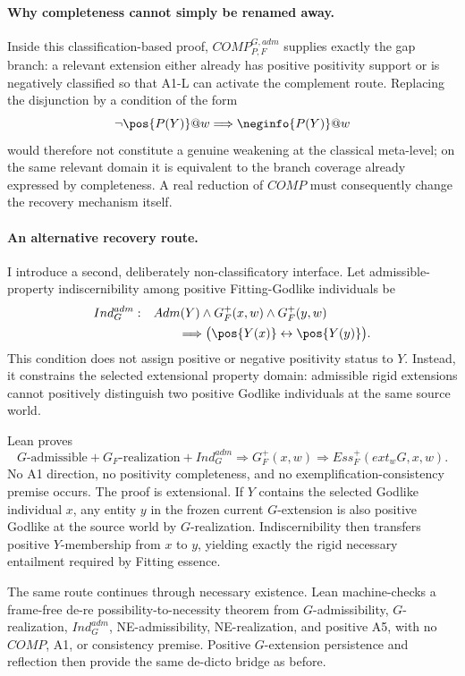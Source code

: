 \paragraph{Why completeness cannot simply be renamed away.}
Inside this classification-based proof, \(COMP_{P,F}^{G,adm}\) supplies exactly the gap branch: a relevant extension either already has positive positivity support or is negatively classified so that A1-L can activate the complement route. Replacing the disjunction by a condition of the form
\[
  \neg\pos{P(Y)}@w\Longrightarrow\neginfo{P(Y)}@w
\]
would therefore not constitute a genuine weakening at the classical meta-level; on the same relevant domain it is equivalent to the branch coverage already expressed by completeness. A real reduction of \(COMP\) must consequently change the recovery mechanism itself.

\paragraph{An alternative recovery route.}
I introduce a second, deliberately non-classificatory interface. Let admissible-property indiscernibility among positive Fitting-Godlike individuals be
\[
\begin{split}
  Ind_G^{adm}:\quad
  &Adm(Y)\land G_F^+(x,w)\land G_F^+(y,w)\\
  &\qquad\Longrightarrow
  \bigl(\pos{Y(x)}\leftrightarrow\pos{Y(y)}\bigr).
\end{split}
\]
This condition does not assign positive or negative positivity status to \(Y\). Instead, it constrains the selected extensional property domain: admissible rigid extensions cannot positively distinguish two positive Godlike individuals at the same source world.

Lean proves
\[
\boxed{
G\text{-admissible}
+G_F\text{-realization}
+Ind_G^{adm}
\Longrightarrow
G_F^+(x,w)\Rightarrow Ess_F^+(ext_wG,x,w).
}
\]
No A1 direction, no positivity completeness, and no exemplification-consistency premise occurs. The proof is extensional. If \(Y\) contains the selected Godlike individual \(x\), any entity \(y\) in the frozen current \(G\)-extension is also positive Godlike at the source world by \(G\)-realization. Indiscernibility then transfers positive \(Y\)-membership from \(x\) to \(y\), yielding exactly the rigid necessary entailment required by Fitting essence.

The same route continues through necessary existence. Lean machine-checks a frame-free de-re possibility-to-necessity theorem from \(G\)-admissibility, \(G\)-realization, \(Ind_G^{adm}\), NE-admissibility, NE-realization, and positive A5, with no \(COMP\), A1, or consistency premise. Positive \(G\)-extension persistence and reflection then provide the same de-dicto bridge as before.


